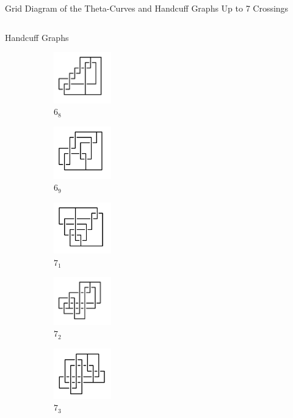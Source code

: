 \documentclass[final]{beamer}
\begin{document}
\begin{frame}[t]
\begin{alertblock}{Grid Diagram of the Theta-Curves and Handcuff Graphs Up to 7 Crossings}
\begin{columns}[t]
\begin{column}{0.3\textwidth}
\begin{alertblock}{Handcuff Graphs}
\begin{figure}
    \begin{subfigure}{0.15\textwidth}
    \includegraphics[width=2.5cm]{../Midterm_Poster/grid_diagram/handcuff_6_8.png}
    \caption{$6_{8}$} 
    \end{subfigure}
    \begin{subfigure}{0.15\textwidth}
    \includegraphics[width=2.5cm]{../Midterm_Poster/grid_diagram/handcuff_6_9.png}
    \caption{$6_{9}$} 
    \end{subfigure}
    \begin{subfigure}{0.15\textwidth}
    \includegraphics[width=2.5cm]{../Midterm_Poster/grid_diagram/handcuff_7_1.png}
    \caption{$7_{1}$} 
    \end{subfigure}
    \begin{subfigure}{0.15\textwidth}
    \includegraphics[width=2.5cm]{../Midterm_Poster/grid_diagram/handcuff_7_2.png}
    \caption{$7_{2}$} 
    \end{subfigure}
    \begin{subfigure}{0.15\textwidth}
    \includegraphics[width=2.5cm]{../Midterm_Poster/grid_diagram/handcuff_7_3.png}
    \caption{$7_{3}$} 
    \end{subfigure}
    \begin{subfigure}{0.15\textwidth}

\end{subfigure}
\end{figure}
\end{alertblock}
\end{column}
\end{columns}
\end{alertblock}
\end{frame}
\end{document}
